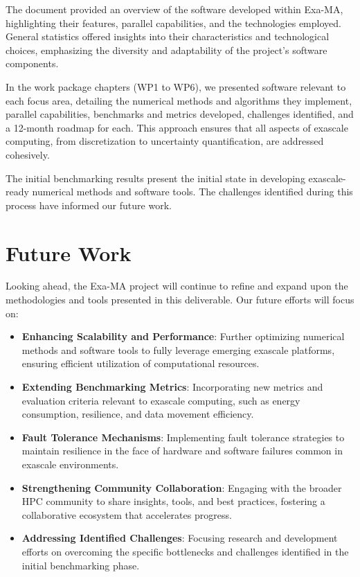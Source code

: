 The document provided an overview of the software developed within Exa-MA, highlighting their features, parallel capabilities, and the technologies employed. General statistics offered insights into their characteristics and technological choices, emphasizing the diversity and adaptability of the project's software components.

In the work package chapters (WP1 to WP6), we presented software relevant to each focus area, detailing the numerical methods and algorithms they implement, parallel capabilities, benchmarks and metrics developed, challenges identified, and a 12-month roadmap for each. 
This  approach ensures that all aspects of exascale computing, from discretization to uncertainty quantification, are addressed cohesively.

The initial benchmarking results present the initial state in developing exascale-ready numerical methods and software tools. 
The challenges identified during this process have informed our future work.

\section*{Future Work}

Looking ahead, the Exa-MA project will continue to refine and expand upon the methodologies and tools presented in this deliverable. 
Our future efforts will focus on:

\begin{itemize}
    \item \textbf{Enhancing Scalability and Performance}: Further optimizing numerical methods and software tools to fully leverage emerging exascale platforms, ensuring efficient utilization of computational resources.
    
    \item \textbf{Extending Benchmarking Metrics}: Incorporating new metrics and evaluation criteria relevant to exascale computing, such as energy consumption, resilience, and data movement efficiency.
    \item \textbf{Fault Tolerance Mechanisms}: Implementing fault tolerance strategies to maintain resilience in the face of hardware and software failures common in exascale environments.
    \item \textbf{Strengthening Community Collaboration}: Engaging with the broader HPC community to share insights, tools, and best practices, fostering a collaborative ecosystem that accelerates progress.
    \item \textbf{Addressing Identified Challenges}: Focusing research and development efforts on overcoming the specific bottlenecks and challenges identified in the initial benchmarking phase.
\end{itemize}

